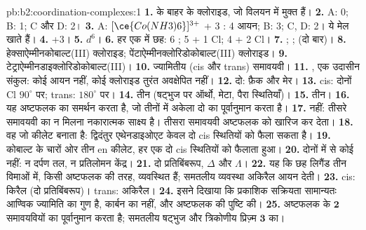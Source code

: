\begin{solution}{pb:b2:coordination-complexes:1}
\textbf{1.}  के बाहर के क्लोराइड, जो विलयन में मुक्त हैं।
\textbf{2.} A: 0; B: 1; C और D: 2।
\textbf{3.} A: $[\ce{Co(NH3)6}]^{3+}$ + 3 : 4 आयन; B: 3; C, D: 2। ये मेल खाते हैं।
\textbf{4.} +3।
\textbf{5.} $d^6$।
\textbf{6.} हर एक में छह: 6 ; 5  + 1 Cl; 4  + 2 Cl।
\textbf{7.} ; ;  (दो बार)।
\textbf{8.} हेक्साऐम्मीनकोबाल्ट(III) क्लोराइड; पेंटाऐम्मीनक्लोरिडोकोबाल्ट(III) क्लोराइड।
\textbf{9.} टेट्राऐम्मीनडाइक्लोरिडोकोबाल्ट(III)।
\textbf{10.} ज्यामितीय (cis और trans) समावयवी।
\textbf{11.} \ce{[CoCl3(NH3)3]}, एक उदासीन संकुल: कोई आयन नहीं, कोई क्लोराइड तुरंत
अवक्षेपित नहीं।
\textbf{12.} दो: फ़ैक और मेर।
\textbf{13.} cis: दोनों Cl $90^\circ$ पर; trans: $180^\circ$ पर।
\textbf{14.} तीन (षट्भुज पर ऑर्थो, मेटा, पैरा स्थितियाँ)।
\textbf{15.} तीन।
\textbf{16.} यह अष्टफलक का समर्थन करता है, जो तीनों में अकेला दो का पूर्वानुमान करता है।
\textbf{17.} नहीं: तीसरे समावयवी का न मिलना नकारात्मक साक्ष्य है। तीसरा समावयवी
अष्टफलक को खारिज कर देता।
\textbf{18.} वह जो कीलेट बनाता है: द्विदंतुर एथेनडाइओएट केवल दो
cis स्थितियों को फैला सकता है।
\textbf{19.} कोबाल्ट के चारों ओर तीन en कीलेट, हर एक दो cis स्थितियों को फैलाता हुआ।
\textbf{20.} दोनों में से कोई नहीं: न दर्पण तल, न प्रतिलोमन केंद्र।
\textbf{21.} दो प्रतिबिंबरूप, $\Delta$ और $\Lambda$।
\textbf{22.} यह कि छह लिगैंड तीन विमाओं में, किसी अष्टफलक की तरह, व्यवस्थित हैं;
समतलीय व्यवस्था अकिरैल आयन देती।
\textbf{23.} cis: किरैल (दो प्रतिबिंबरूप)। trans: अकिरैल।
\textbf{24.} इसने दिखाया कि प्रकाशिक सक्रियता सामान्यतः आण्विक ज्यामिति का गुण है,
कार्बन का नहीं, और अष्टफलक की पुष्टि की।
\textbf{25.} अष्टफलक \ce{[CoCl2(NH3)4]+} के $\boldsymbol{2}$ समावयवियों का पूर्वानुमान करता है;
समतलीय षट्भुज और त्रिकोणीय प्रिज़्म $\boldsymbol{3}$ का।
\end{solution}
